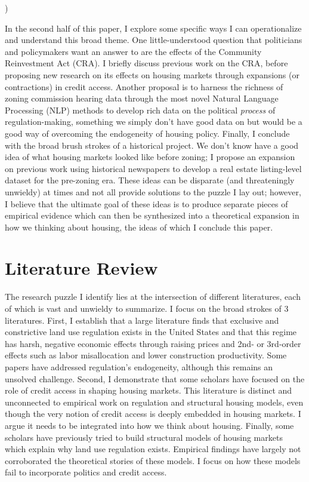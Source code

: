 )\documentclass{article}[11pt]
\begin{document}
In the second half of this paper, I explore some specific ways I can operationalize and understand this broad theme. One little-understood question that politicians and policymakers want an answer to are the effects of the Community Reinvestment Act (CRA). I briefly discuss previous work on the CRA, before proposing new research on its effects on housing markets through expansions (or contractions) in credit access. Another proposal is to harness the richness of zoning commission hearing data through the most novel Natural Language Processing (NLP) methods to develop rich data on the political \textit{process} of regulation-making, something we simply don't have good data on but would be a good way of overcoming the endogeneity of housing policy. Finally, I conclude with the broad brush strokes of a historical project. We don't know have a good idea of what housing markets looked like before zoning; I propose an expansion on previous work using historical newspapers to develop a real estate listing-level dataset for the pre-zoning era. These ideas can be disparate (and threateningly unwieldy) at times and not all provide solutions to the puzzle I lay out; however, I believe that the ultimate goal of these ideas is to produce separate pieces of empirical evidence which can then be synthesized into a theoretical expansion in how we thinking about housing, the ideas of which I conclude this paper.

\section{Literature Review}

The research puzzle I identify lies at the intersection of different literatures, each of which is vast and unwieldy to summarize. I focus on the broad strokes of 3 literatures. First, I establish that a large literature finds that exclusive and constrictive land use regulation exists in the United States and that this regime has harsh, negative economic effects through raising prices and 2nd- or 3rd-order effects such as labor misallocation and lower construction productivity. Some papers have addressed regulation's endogeneity, although this remains an unsolved challenge. Second, I demonstrate that some scholars have focused on the role of credit access in shaping housing markets. This literature is distinct and unconnected to empirical work on regulation and structural housing models, even though the very notion of credit access is deeply embedded in housing markets. I argue it needs to be integrated into how we think about housing. Finally, some scholars have previously tried to build structural models of housing markets which explain why land use regulation exists. Empirical findings have largely not corroborated the theoretical stories of these models. I focus on how these models fail to incorporate politics and credit access.
		
\end{document}
